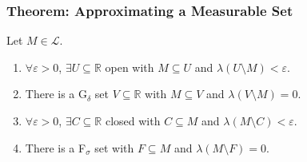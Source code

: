 \documentclass[10pt]{extarticle}
\newcommand{\R}{\mathbb{R}}
\begin{document}
  \subsubsection{Theorem: Approximating a Measurable Set}%
  Let $M\in\mathcal{L}$.
  \begin{enumerate}[(1)]
    \item $\forall \varepsilon > 0$, $\exists U\subseteq \R$ open with $M\subseteq U$ and $\lambda(U\setminus M) < \varepsilon$.
    \item There is a G$_{\delta}$ set $V\subseteq \R$ with $M\subseteq V$ and $\lambda(V\setminus M) = 0$.
    \item $\forall \varepsilon > 0$, $\exists C\subseteq \R$ closed with $C\subseteq M$ and $\lambda(M\setminus C) < \varepsilon$.
    \item There is a F$_{\sigma}$ set with $F\subseteq M$ and $\lambda(M\setminus F) = 0$.
  \end{enumerate}
\end{document}
